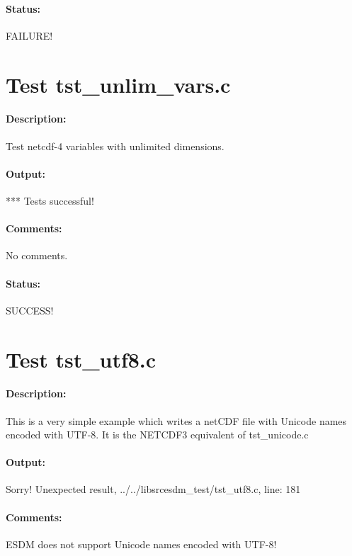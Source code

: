\paragraph{Status:} FAILURE!

{\color{blue}{Help, Julian!}}

\section{Test tst\_unlim\_vars.c}

\paragraph{Description:} Test netcdf-4 variables with unlimited dimensions.

\paragraph{Output:} *** Tests successful!

\paragraph{Comments:} No comments.

\paragraph{Status:} SUCCESS!

\section{Test tst\_utf8.c}

\paragraph{Description:} This is a very simple example which writes a netCDF file with Unicode names encoded with UTF-8. It is the NETCDF3 equivalent of tst\_unicode.c

\paragraph{Output:} Sorry! Unexpected result, ../../libsrcesdm\_test/tst\_utf8.c, line: 181

\paragraph{Comments:} ESDM does not support Unicode names encoded with UTF-8!

